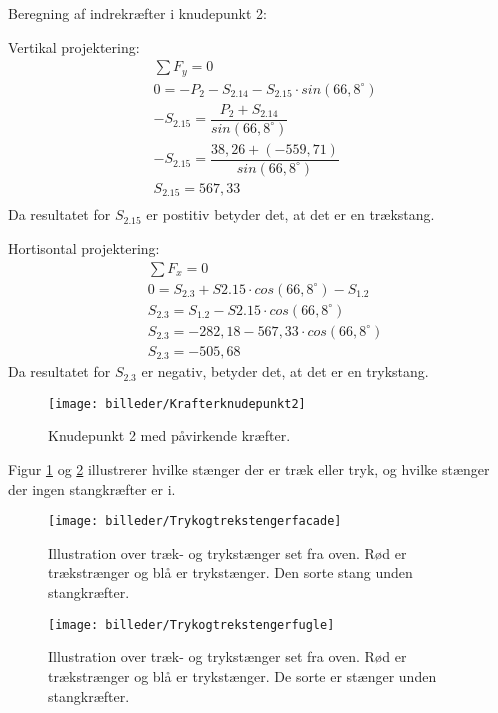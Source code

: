 Beregning af indrekræfter i knudepunkt 2:

Vertikal projektering:
\begin{align*}
& \sum F_{y} = 0 \\
& 0 = - P_{2} - S_{2.14} - S_{2.15} \cdot sin(66,8^ {\circ}) \\
& - S_{2.15} = \dfrac{P_{2}  + S_{2.14}}{sin(66,8^ {\circ}) } \\
& - S_{2.15} = \dfrac{ 38,26 + (-559,71)}{sin(66,8^ {\circ}) } \\
& S_{2.15} = 567,33 \\
\end{align*}
Da resultatet for $S_{2.15}$ er postitiv betyder det, at det er en trækstang.

Hortisontal projektering:
\begin{align*}
& \sum F_{x} = 0 \\
& 0 = S_{2.3} +  S{2.15} \cdot cos(66,8^ {\circ}) - S_{1.2} \\
& S_{2.3} = S_{1.2} - S{2.15} \cdot cos(66,8^ {\circ})\\
& S_{2.3} = -282,18  - 567,33 \cdot cos(66,8^ {\circ})\\
& S_{2.3} = -505,68
\end{align*}
Da resultatet for $S_{2.3}$ er negativ, betyder det, at det er en trykstang.
\begin{figure}[H] \centering
\texttt{[image: billeder/Krafterknudepunkt2]} \caption{Knudepunkt 2 med påvirkende kræfter.}
\end{figure}

Figur \ref{fig:indrekrafterfacade} og \ref{fig:indrekrafterfugle} illustrerer hvilke stænger der er træk eller  tryk, og hvilke stænger der ingen stangkræfter er i.
\begin{figure}[H]
\centering
\texttt{[image: billeder/Trykogtrekstengerfacade]}
\caption{Illustration over træk- og trykstænger set fra oven. Rød er trækstrænger og blå er trykstænger. Den sorte stang unden stangkræfter.}
\label{fig:indrekrafterfacade}
\end{figure}

\begin{figure}[H]
\centering
\texttt{[image: billeder/Trykogtrekstengerfugle]}
\caption{Illustration over træk- og trykstænger set fra oven. Rød er trækstrænger og blå er trykstænger. De sorte er stænger unden stangkræfter.}
\label{fig:indrekrafterfugle}
\end{figure}

